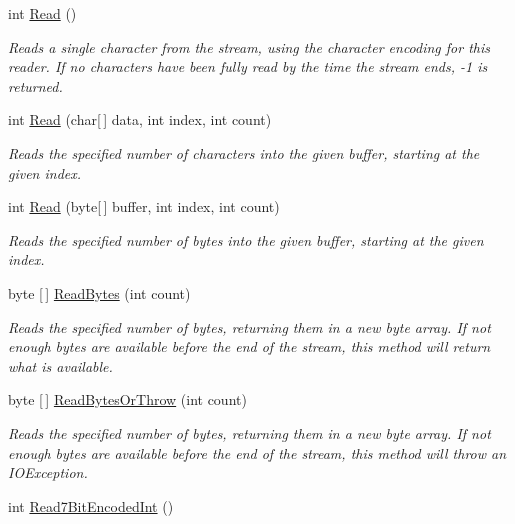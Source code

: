 \begin{DoxyCompactItemize}
int \mbox{\hyperlink{class_t_net_1_1_i_o_1_1_endian_binary_reader_a267313b4e6fb36b67bf31174bb6319c3}{Read}} ()
\begin{DoxyCompactList}\small\item\em Reads a single character from the stream, using the character encoding for this reader. If no characters have been fully read by the time the stream ends, -\/1 is returned. \end{DoxyCompactList}\item 
int \mbox{\hyperlink{class_t_net_1_1_i_o_1_1_endian_binary_reader_a9d6d1fd5e959469c969c75aed6228039}{Read}} (char\mbox{[}$\,$\mbox{]} data, int index, int count)
\begin{DoxyCompactList}\small\item\em Reads the specified number of characters into the given buffer, starting at the given index. \end{DoxyCompactList}\item 
int \mbox{\hyperlink{class_t_net_1_1_i_o_1_1_endian_binary_reader_ae1da6709fb1dbce8a8936ed7b0e95db4}{Read}} (byte\mbox{[}$\,$\mbox{]} buffer, int index, int count)
\begin{DoxyCompactList}\small\item\em Reads the specified number of bytes into the given buffer, starting at the given index. \end{DoxyCompactList}\item 
byte \mbox{[}$\,$\mbox{]} \mbox{\hyperlink{class_t_net_1_1_i_o_1_1_endian_binary_reader_ad06f8519f7c57b123ec9ba2616f35440}{Read\+Bytes}} (int count)
\begin{DoxyCompactList}\small\item\em Reads the specified number of bytes, returning them in a new byte array. If not enough bytes are available before the end of the stream, this method will return what is available. \end{DoxyCompactList}\item 
byte \mbox{[}$\,$\mbox{]} \mbox{\hyperlink{class_t_net_1_1_i_o_1_1_endian_binary_reader_aa192e348d6dc146c53a7aa9bd218c197}{Read\+Bytes\+Or\+Throw}} (int count)
\begin{DoxyCompactList}\small\item\em Reads the specified number of bytes, returning them in a new byte array. If not enough bytes are available before the end of the stream, this method will throw an I\+O\+Exception. \end{DoxyCompactList}\item 
int \mbox{\hyperlink{class_t_net_1_1_i_o_1_1_endian_binary_reader_a4c125e7d627fedbd4d9146a99c53e3fb}{Read7\+Bit\+Encoded\+Int}} ()

\end{DoxyCompactItemize}
